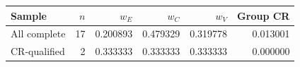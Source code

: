 \begin{tabular}{@{}lrrrrr@{}}
\toprule
Sample & $n$ & $w_E$ & $w_C$ & $w_V$ & Group CR \\
\midrule
All complete & 17 & 0.200893 & 0.479329 & 0.319778 & 0.013001 \\
CR-qualified & 2 & 0.333333 & 0.333333 & 0.333333 & 0.000000 \\
\bottomrule
\end{tabular}
